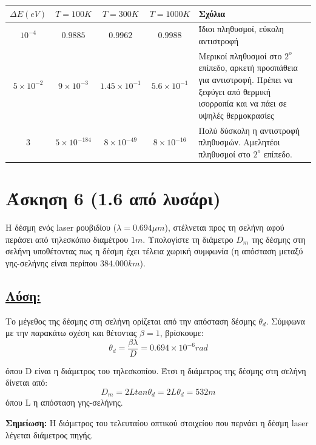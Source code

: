 \documentclass[a4paper,11pt,titlepage]{article}
\begin{document}
\begin{table}[h!]
\begin{center}
    \begin{tabular}{ | c | c | c | c | p{5cm} |}
    \hline
     ${\Delta}E (eV)$	& $T=100K$		& $T=300K$ 		& $T=1000K$		& Σχόλια\\ \hline
     $10^{-4}$		& $0.9885$		& $0.9962$		& $0.9988$		& Ίδιοι πληθυσμοί, εύκολη αντιστροφή\\ \hline
     $5\times10^{-2}$	& $9\times10^{-3}$	& $1.45\times10^{-1}$	& $5.6\times10^{-1}$	& Μερικοί πληθυσμοί στο $2^ο$ επίπεδο, αρκετή προσπάθεια για αντιστροφή. Πρέπει να ξεφύγει από θερμική ισορροπία και να πάει σε υψηλές θερμοκρασίες\\ \hline
     $3$			& $5\times10^{-184}$	& $8\times10^{-49}$	& $8\times10^{-16}$	& Πολύ δύσκολη η αντιστροφή πληθυσμών. Αμελητέοι πληθυσμοί στο $2^ο$ επίπεδο.\\ \hline
    \end{tabular}
\end{center}
\end{table}
\newpage
\section{Άσκηση 6 (1.6 από λυσάρι)}

Η δέσμη ενός laser ρουβιδίου ($\lambda=0.694{\mu}m$), στέλνεται προς τη σελήνη αφού περάσει από τηλεσκόπιο διαμέτρου $1m$. Υπολογίστε τη διάμετρο $D_m$ της δέσμης στη σελήνη υποθέτοντας πως η δέσμη έχει τέλεια χωρική συμφωνία (η απόσταση μεταξύ γης-σελήνης είναι περίπου $384.000km$).
\subsection*{\underline{Λύση:}}

Το μέγεθος της δέσμης στη σελήνη ορίζεται από την απόσταση δέσμης $\theta_d$. Σύμφωνα με την παρακάτω σχέση και θέτοντας $\beta=1$, βρίσκουμε:
\begin{equation}
 \theta_d=\frac{\beta\lambda}{D}=0.694\times10^{-6} rad
\end{equation}

όπου D είναι η διάμετρος του τηλεσκοπίου. Έτσι η διάμετρος της δέσμης στη σελήνη δίνεται από:
\begin{equation}
 D_m=2Ltan{\theta_d}=2L\theta_d=532m
\end{equation}
όπου L η απόσταση γης-σελήνης.

\textbf{Σημείωση:} Η διάμετρος του τελευταίου οπτικού στοιχείου που περνάει η δέσμη laser λέγεται διάμετρος πηγής.
\end{document}
